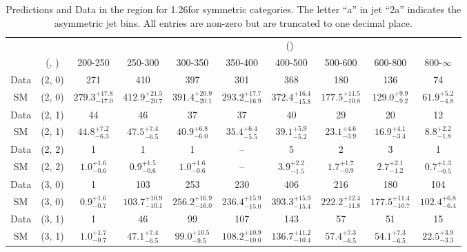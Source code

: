 \begin{table}[h!]
\tiny
\centering
\caption{Predictions and Data in the \mj region for 1.26\ifb for symmetric categories. The letter ``a'' in jet \eg ``2a''  indicates the asymmetric jet bins. All entries are non-zero but are truncated to one decimal place.\label{tab:predall_mu_comb_sym}}
\begin{tabular}
{cccccccccc}
	\hline\hline
&	&	& \multicolumn{8}{c}{\scalht (\gev)}\\ 
	&	 (\njet, \nb) & 200-250 & 250-300 & 300-350 & 350-400 & 400-500 & 500-600 & 600-800 & 800-$\infty$ \\ [0.8ex] 
\hline
	Data & (2, 0) & 271 & 410 & 397 & 301 & 368 & 180 & 136 & 74 \\[0.5ex] 
	SM & (2, 0) & $279.3^{+ 17.8 }_{- 17.0 }$ & $412.9^{+ 21.5 }_{- 20.7 }$ & $391.4^{+ 20.9 }_{- 20.1 }$ & $293.2^{+ 17.7 }_{- 16.9 }$ & $372.4^{+ 16.4 }_{- 15.8 }$ & $177.5^{+ 11.5 }_{- 10.8 }$ & $129.0^{+ 9.9 }_{- 9.2 }$ & $61.9^{+ 5.2 }_{- 4.8 }$ \\[0.5ex] 
	Data & (2, 1) & 44 & 46 & 37 & 37 & 40 & 29 & 20 & 12 \\[0.5ex] 
	SM & (2, 1) & $44.8^{+ 7.2 }_{- 6.3 }$ & $47.5^{+ 7.4 }_{- 6.5 }$ & $40.9^{+ 6.8 }_{- 6.0 }$ & $35.4^{+ 6.4 }_{- 5.5 }$ & $39.1^{+ 5.9 }_{- 5.2 }$ & $23.1^{+ 4.6 }_{- 3.9 }$ & $16.9^{+ 4.1 }_{- 3.4 }$ & $8.8^{+ 2.2 }_{- 1.8 }$ \\[0.5ex] 
	Data & (2, 2) & 1 & 1 & 1 & -- & 5 & 2 & 3 & 1 \\[0.5ex] 
	SM & (2, 2) & $1.0^{+ 1.6 }_{- 0.6 }$ & $0.9^{+ 1.5 }_{- 0.6 }$ & $1.0^{+ 1.6 }_{- 0.6 }$ & -- & $3.9^{+ 2.2 }_{- 1.5 }$ & $1.7^{+ 1.7 }_{- 0.9 }$ & $2.7^{+ 2.1 }_{- 1.2 }$ & $0.7^{+ 1.3 }_{- 0.5 }$ \\[0.5ex] 
	Data & (3, 0) & 1 & 103 & 253 & 230 & 406 & 216 & 180 & 104 \\[0.5ex] 
	SM & (3, 0) & $0.9^{+ 1.6 }_{- 0.7 }$ & $103.7^{+ 10.9 }_{- 10.1 }$ & $256.2^{+ 16.9 }_{- 16.0 }$ & $236.4^{+ 15.9 }_{- 15.0 }$ & $393.3^{+ 15.9 }_{- 15.4 }$ & $222.2^{+ 12.4 }_{- 11.8 }$ & $177.5^{+ 11.4 }_{- 10.7 }$ & $102.4^{+ 6.8 }_{- 6.4 }$ \\[0.5ex] 
	Data & (3, 1) & 1 & 46 & 99 & 107 & 143 & 57 & 51 & 15 \\[0.5ex] 
	SM & (3, 1) & $1.0^{+ 1.7 }_{- 0.7 }$ & $47.1^{+ 7.4 }_{- 6.5 }$ & $99.0^{+ 10.5 }_{- 9.5 }$ & $108.2^{+ 10.9 }_{- 10.0 }$ & $136.7^{+ 11.2 }_{- 10.4 }$ & $57.4^{+ 7.3 }_{- 6.5 }$ & $54.1^{+ 7.3 }_{- 6.5 }$ & $22.5^{+ 3.9 }_{- 3.3 }$ \\[0.5ex] 

\end{tabular}
\end{table}
